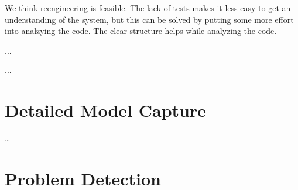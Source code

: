 \documentclass{article}
\begin{document}
We think reengineering is feasible. The lack of tests makes it less easy to get an understanding of the system, but this can be solved by putting some more effort into analzying the code. The clear structure helps while analyzing the code.

...

...

\section{Detailed Model Capture}
\ldots

\section{Problem Detection}
\end{document}
